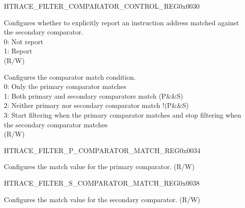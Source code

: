 \addtocounter{Regfloat}{-1}
\begin{register}{H}{TRACE\_FILTER\_COMPARATOR\_CONTROL\_REG}{0x0030}
\begin{regdesc}\begin{reglist}
\item [Continued from the previous page...]

\label{fielddesc:TRACESNOTIFY}\item [TRACE\_S\_NOTIFY] Configures whether to explicitly report an instruction address matched against the secondary comparator.\\
0: Not report\\
1: Report\\  (R/W)
\label{fielddesc:TRACEMATCHMODE}\item [TRACE\_MATCH\_MODE] Configures the comparator match condition.\\
0: Only the primary comparator matches\\
1: Both primary and secondary comparators match (P\&\&S)\\
2: Neither primary nor secondary comparator match !(P\&\&S)\\
3: Start filtering when the primary comparator matches and stop filtering when the secondary comparator matches\\ (R/W)
\end{reglist}\end{regdesc}
\end{register}


\begin{register}{H}{TRACE\_FILTER\_P\_COMPARATOR\_MATCH\_REG}{0x0034}\label{regdesc:TRACEFILTERPCOMPARATORMATCHREG}
%
\regnewline%
\begin{regdesc}\begin{reglist}
\label{fielddesc:TRACEPMATCH}\item [TRACE\_P\_MATCH] Configures the match value for the primary comparator. (R/W)
\end{reglist}\end{regdesc}
\end{register}


\begin{register}{H}{TRACE\_FILTER\_S\_COMPARATOR\_MATCH\_REG}{0x0038}\label{regdesc:TRACEFILTERSCOMPARATORMATCHREG}
%
\regnewline%
\begin{regdesc}\begin{reglist}
\label{fielddesc:TRACESMATCH}\item [TRACE\_S\_MATCH] Configures the match value for the secondary comparator. (R/W)
\end{reglist}\end{regdesc}
\end{register}


